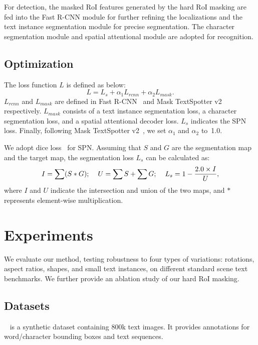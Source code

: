 \documentclass[runningheads]{llncs}
\newcommand{\minienumerate}[1]{\noindent{\textbf{#1}}}
\begin{document}
For detection, the masked RoI features generated by the hard RoI masking are fed into the Fast R-CNN module for further refining the localizations and the text instance segmentation module for precise segmentation. The character segmentation module and spatial attentional module are adopted for recognition.

\subsection{Optimization}
The loss function $L$ is defined as below:
\begin{equation}
    L = L_s + \alpha_1 L_{rcnn} + \alpha_2 L_{mask}.
\end{equation}
$L_{rcnn}$ and $L_{mask}$ are defined in Fast R-CNN~\cite{fastrcnn} and Mask TextSpotter v2~\cite{liao2019mask} respectively. $L_{mask}$ consists of a text instance segmentation loss, a character segmentation loss, and a spatial attentional decoder loss. $L_s$ indicates the SPN loss. Finally, following Mask TextSpotter v2~\cite{liao2019mask}, we set $\alpha_1$ and $\alpha_2$ to~1.0.

We adopt dice loss~\cite{milletari2016v} for SPN. Assuming that $S$ and $G$ are the segmentation map and the target map, the segmentation loss $L_s$ can be calculated as:
\begin{gather}
I = \sum (S * G); \hspace{4mm}  
        U = \sum S + \sum G; \hspace{4mm}
        L_s = 1 - \frac{2.0 \times I}{U}, 
\end{gather}
where $I$ and $U$ indicate the intersection and union of the two maps, and $*$ represents element-wise multiplication.

\section{Experiments}
We evaluate our method, testing robustness to four types of variations: rotations, aspect ratios, shapes, and small text instances, on different standard scene text benchmarks.
We further provide an ablation study of our hard RoI masking.

\subsection{Datasets}
\minienumerate{SynthText}~\cite{gupta2016synthetic} is a synthetic dataset containing 800k text images. It provides annotations for word/character bounding boxes and text sequences.
\end{document}
